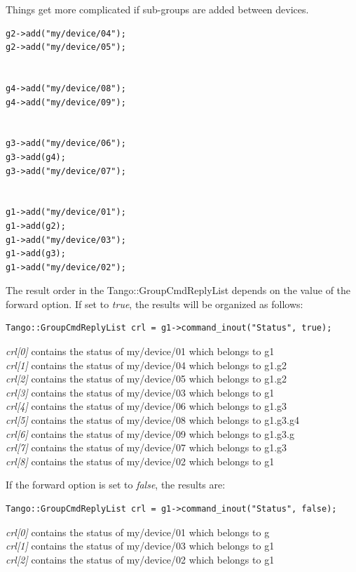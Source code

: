 Things get more complicated if sub-groups are added \textquotedbl{}between\textquotedbl{}
devices.
\begin{verbatim}
g2->add("my/device/04");
g2->add("my/device/05");
 

g4->add("my/device/08");
g4->add("my/device/09");
 

g3->add("my/device/06");
g3->add(g4);
g3->add("my/device/07");
 

g1->add("my/device/01");
g1->add(g2);
g1->add("my/device/03");
g1->add(g3);
g1->add("my/device/02");
\end{verbatim}
The result order in the Tango::GroupCmdReplyList depends on the value
of the forward option. If set to \emph{true}, the
results will be organized as follows:
\begin{verbatim}
Tango::GroupCmdReplyList crl = g1->command_inout("Status", true);
\end{verbatim}
\emph{crl{[}0{]}} contains the status of my/device/01 which belongs
to g1\\
\emph{crl{[}1{]}} contains the status of my/device/04 which belongs
to g1.g2\\
\emph{crl{[}2{]}} contains the status of my/device/05 which belongs
to g1.g2\\
\emph{crl{[}3{]}} contains the status of my/device/03 which belongs
to g1\\
\emph{crl{[}4{]}} contains the status of my/device/06 which belongs
to g1.g3\\
\emph{crl{[}5{]}} contains the status of my/device/08 which belongs
to g1.g3.g4\\
\emph{crl{[}6{]}} contains the status of my/device/09 which belongs
to g1.g3.g \\
\emph{crl{[}7{]}} contains the status of my/device/07 which belongs
to g1.g3\\
\emph{crl{[}8{]}} contains the status of my/device/02 which belongs
to g1 

If the forward option is set to \emph{false}, the results are:
\begin{verbatim}
Tango::GroupCmdReplyList crl = g1->command_inout("Status", false); 
\end{verbatim}
\emph{crl{[}0{]}} contains the status of my/device/01 which belongs
to g \\
\emph{crl{[}1{]}} contains the status of my/device/03 which belongs
to g1\\
\emph{crl{[}2{]}} contains the status of my/device/02 which belongs
to g1


